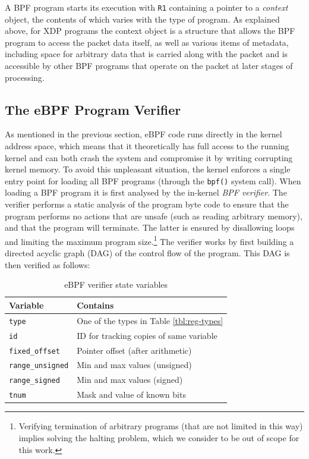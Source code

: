 \documentclass[10pt,sigconf]{acmart}
\begin{document}
A BPF program starts its execution with \texttt{R1} containing a pointer to a
\emph{context} object, the contents of which varies with the type of program. As
explained above, for XDP programs the context object is a structure that allows
the BPF program to access the packet data itself, as well as various items of
metadata, including space for arbitrary data that is carried along with the
packet and is accessible by other BPF programs that operate on the packet at
later stages of processing.

\subsection{The eBPF Program Verifier}
\label{sec:bpf-verifier}
As mentioned in the previous section, eBPF code runs directly in the kernel
address space, which means that it theoretically has full access to the running
kernel and can both crash the system and compromise it by writing corrupting
kernel memory. To avoid this unpleasant situation, the kernel enforces a single
entry point for loading all BPF programs (through the \texttt{bpf()} system
call). When loading a BPF program it is first analysed by the in-kernel
\emph{BPF verifier}. The verifier performs a static analysis of the program byte
code to ensure that the program performs no actions that are unsafe (such as
reading arbitrary memory), and that the program will terminate. The latter is
ensured by disallowing loops and limiting the maximum program
size.\footnote{Verifying termination of arbitrary programs (that are not limited
  in this way) implies solving the halting problem, which we consider to be out
  of scope for this work.} The verifier works by first building a directed acyclic
graph (DAG) of the control flow of the program. This DAG is then verified as
follows:

\begin{table}[tbp]
\caption{\label{tbl:vrf-state-vars}
eBPF verifier state variables}
\centering
\begin{tabular}{ll}
\toprule
Variable & Contains\\
\midrule
\texttt{type} & One of the types in Table \ref{tbl:reg-types}\\
\texttt{id} & ID for tracking copies of same variable\\
\texttt{fixed\_offset} & Pointer offset (after arithmetic)\\
\texttt{range\_unsigned} & Min and max values (unsigned)\\
\texttt{range\_signed} & Min and max values (signed)\\
\texttt{tnum} & Mask and value of known bits\\
\bottomrule
\end{tabular}
\end{table}
\end{document}

